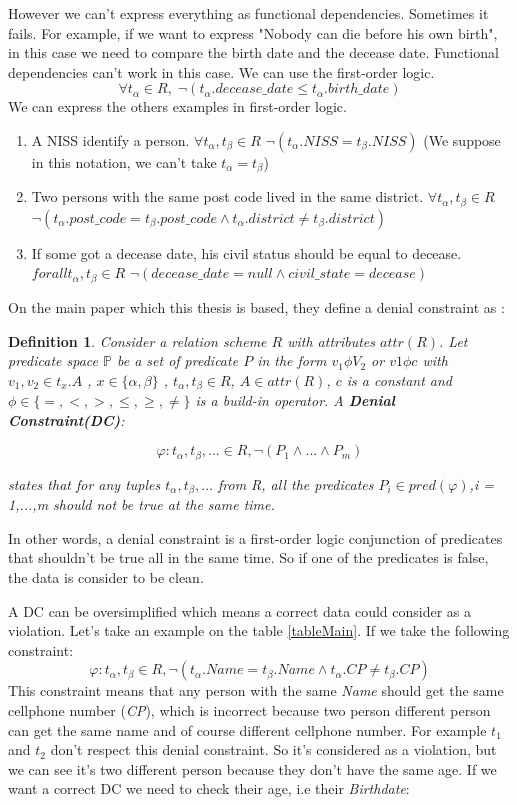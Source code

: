 \documentclass[letterpaper, 12pt]{report}
\newtheorem{mydef}{Definition}
\begin{document}
However we can't express everything as functional dependencies. Sometimes it fails. For example, if we want to express "Nobody can die before his own birth", in this case we need to compare the birth date and the decease date. Functional dependencies can't work in this case. We can use the first-order logic. 
$$\forall t_\alpha \in R, \; \neg(t_\alpha.decease\_date \leq t_\alpha.birth\_date)$$ We can express the others examples in first-order logic.

\begin{enumerate}
\item A NISS identify a person. $\forall t_\alpha,t_\beta \in R$ $\neg(t_\alpha.NISS = t_\beta.NISS)$ (We suppose in this notation, we can't take $t_\alpha = t_\beta$)
\item Two persons with the same post code lived in the same district. $\forall t_\alpha,t_\beta \in R$ $\neg(t_\alpha.post\_code = t_\beta.post\_code \wedge t_\alpha.district \neq t_\beta.district) $
\item If some got a decease date, his civil status should be equal to decease. $forall t_\alpha,t_\beta \in R$ $\neg(decease\_date = null \wedge civil\_state = decease)$
\end{enumerate}

On the main paper which this thesis is based, they define a denial constraint as \cite{main}:

\begin{mydef}
Consider a relation scheme $R$ with attributes $attr(R)$. Let predicate space $\mathbb{P}$ be a set of predicate  $P$ in the form  $v_1 \phi V_2$ or $v1 \phi c$ with $v_1,v_2 \in t_x.A$ , $x \in \{\alpha,\beta\}$ , $t_\alpha,t_\beta \in R$, $A \in attr(R)$, $c$ is a constant and $\phi \in \{ =,<,>,\leq, \geq, \neq \}$ is a build-in operator.  A \textbf{Denial Constraint(DC)}:

$$\varphi : t_\alpha,t_\beta,... \in R, \neg(P_1 \wedge ... \wedge P_m)$$

states that for any tuples $t_\alpha,t_\beta,...$ from R, all the predicates $P_i \in pred(\varphi)$,i = 1,...,m should not be true at the same time.
\end{mydef}

In other words, a denial constraint is a first-order logic conjunction of predicates that shouldn't be true all in the same time. So if one of the predicates is false, the data is consider to be clean. 

A DC can be oversimplified which means a correct data could consider as a violation. Let's take an example on the table \ref{tableMain}. If we take the following constraint:
$$ \varphi : t_\alpha,t_\beta \in R, \neg(t_\alpha.Name = t_\beta.Name \wedge t_\alpha.CP \neq t_\beta.CP)$$
This constraint means that any person with the same \emph{Name} should get the same cellphone number (\emph{CP}), which is incorrect because two person different person can get the same name and of course different cellphone number. For example $t_1$ and $t_2$ don't respect this denial constraint. So it's considered as a violation, but we can see it's two different person because they don't have the same age. If we want a correct DC we need to check their age, i.e their \emph{Birthdate}:
\end{document}
